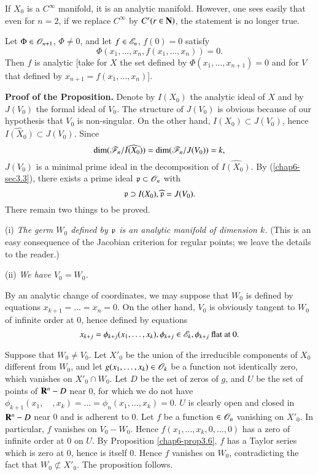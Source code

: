 \setcounter{subsection}{11}
\begin{subexample}\label{chap6-exam3.11.1}
If $X_{0}$ is a $C^{\infty}$ manifold, it is an analytic manifold. However, one sees easily that even for $n=2$, if we replace $C^{\infty}$ by $C^{r}(r\in \mathbf{N})$, the statement is no longer true.
\end{subexample}

\begin{subexample}\label{chap6-exam3.11.2}
Let $\Phi\in \mathscr{O}_{n+1}$, $\Phi\neq 0$, and let $f\in \mathscr{E}_{n}$, $f(0)=0$ satisfy
$$
\Phi(x_{1},\ldots,x_{n},f(x_{1},\ldots,x_{n}))=0.
$$
Then $f$ is analytic [take for $X$ the set defined by $\Phi(x_{1},\ldots,x_{n+1})=0$ and for $V$ that defined by $x_{n+1}=f(x_{1},\ldots,x_{n})$].
\end{subexample}

\noindent
{\bf Proof of the Proposition.} Denote by $I(X_{0})$ the analytic ideal of $X$ and by $J(V_{0})$ the formal ideal of $V_{0}$. The structure of $J(V_{0})$ is obvious because of our hypothesis that $V_{0}$ is non-singular. On the other hand, $I(X_{0})\subset J(V_{0})$, hence $\widehat{I(X_{0})}\subset J(V_{0})$. Since
$$
\dim (\mathscr{F}_{n}/\widehat{I(X_{0})})=\dim (\mathscr{F}_{n}/J(V_{0}))=k,
$$
$J(V_{0})$ is a minimal prime ideal in the decomposition of $\widehat{I(X_{0})}$. By (\ref{chap6-sec3.3}), there exists a prime ideal $\mathfrak{p}\subset \mathscr{O}_{n}$ with
$$
\mathfrak{p}\supset I(X_{0}), \widehat{\mathfrak{p}}=J(V_{0}).
$$
There remain two things to be proved.

(i) {\em The germ $W_{0}$ defined by $\mathfrak{p}$ is an analytic manifold of dimension $k$.} (This is an easy consequence of the Jacobian criterion for regular points; we leave the details to the reader.)

(ii) {\em We have $V_{0}=W_{0}$.}

By an analytic change of coordinates, we may suppose that $W_{0}$ is defined by equations $x_{k+1}=\ldots=x_{n}=0$. On the other hand, $V_{0}$ is obviously tangent to $W_{0}$ of infinite order at $0$, hence defined by equations
$$
x_{k+j}=\phi_{k+j}(x_{1},\ldots,x_{k}),\phi_{k+j}\in \mathscr{E}_{k}, \phi_{k+j}\text{ flat at $0$.}
$$

Suppose that $W_{0}\neq V_{0}$. Let $X'_{0}$ be the union of the irreducible components of $X_{0}$ different from $W_{0}$, and let $g(x_{1},\ldots,x_{k})\in \mathscr{O}_{k}$ be a function not identically zero, which vanishes on $X'_{0}\cap W_{0}$. Let $D$ be the set of zeros of $g$, and $U$ be the set of points of $\mathbf{R}^{n}-D$ near $0$, for which we do not have $\phi_{k+1}(x_{1},\quad,x_{k})=\ldots=\phi_{n}(x_{1},\ldots,x_{k})=0$. $U$ is clearly open and closed in $\mathbf{R}^{n}-D$ near $0$ and is adherent to $0$. Let $f$ be a function $\in \mathscr{O}_{n}$ vanishing on $X'_{0}$. In particular, $f$ vanishes on $V_{0}-W_{0}$. Hence $f(x_{1},\ldots,x_{k},0,\ldots,0)$ has a zero of infinite order at $0$ on $U$. By Proposition \ref{chap6-prop3.6}, $f$ has a Taylor series which is zero at $0$, hence is itself $0$. Hence $f$ vanishes on $W_{0}$, contradicting the fact that $W_{0}\nsubset X'_{0}$. The proposition follows.
